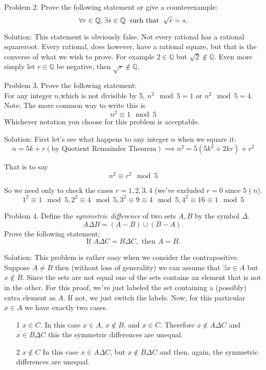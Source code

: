 \documentclass[16 pt]{amsart}
\theoremstyle{definition}
\theoremstyle{remark}
\numberwithin{equation}{subsection}
\newcommand{\Q}{\mathbb{Q}}
\begin{document}
\newpage

Problem 2.
Prove the following statement or give a counterexample:
\[
\forall r\in\Q, \exists s\in\Q \hspace{2mm} \text{such that} \hspace{2mm} \sqrt{r} = s.
\]

\vspace{1in}

Solution: This statement is obviously false.  Not every rational has a rational squareroot.  Every rational, does however, have a rational square, but that is the converse of what we wish to prove.  For example $2\in\Q$ but $\sqrt{2}\notin \Q$.  Even more simply let $r\in\Q$ be negative, then $\sqrt{r}\notin\Q$.

\newpage

Problem 3.
Prove the following statement:\\
For any integer $n$,which is not divisible by 5, $n^2\mod{5} = 1$ or $n^2\mod{5}=4$. \\
Note: The more common way to write this is
\[
n^2 \equiv 1\mod{5}
\]
Whichever notation you choose for this problem is acceptable.

\vspace{1in}

Solution: First let's see what happens to any integer $n$ when we square it:
\[
n = 5k+r (\text{by Quotient Remainder Theorem}) \implies n^2 = 5(5k^2+2kr) + r^2
\]

That is to say
\[
n^2 \equiv r^2 \mod{5}
\]

So we need only to check the cases $r=1,2,3,4$ (we've excluded $r=0$ since $5\nmid n$).
\[
1^2 \equiv 1 \mod{5}, 2^2 \equiv 4 \mod{5}, 3^2 \equiv 9\equiv 4\mod{5}, 4^2 \equiv 16 \equiv 1 \mod{5}
\]

\newpage
Problem 4.
Define the \emph{symmetric difference} of two sets $A,B$ by the symbol $\Delta$.  
\[
A\Delta B = (A-B)\cup (B-A).
\]
Prove the following statement;
\[
\text{If } A\Delta C = B\Delta C, \text{ then } A=B.
\]

\vspace{1in}

Solution:  This problem is rather easy when we consider the contrapositive.\\

Suppose $A\neq B$ then (without loss of generality) we can assume that $\exists x\in A$ but $x\notin B$.  Since the sets are not equal one of the sets contains an element that is not in the other.  For this proof, we've just labeled the set containing a (possibly) extra element as $A$.  If not, we just switch the labels.  Now, for this particular $x\in A$ we have exactly two cases.
\begin{itemize}
\item[1] $x\in C$.  In this case $x\in A$, $x\notin B$, and $x\in C$. Therefore $x\notin A\Delta C$ and $x\in B\Delta C$ this the symmetric differences are unequal.\\
\item[2] $x\notin C$ In this case $x\in A\Delta C$, but $x\notin B\Delta C$ and then, again, the symmetric differences are unequal.
\end{itemize}
\end{document}

